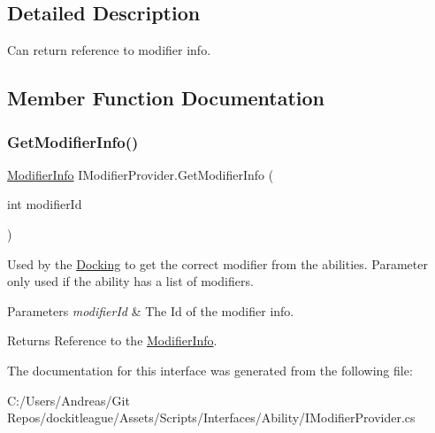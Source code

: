 \subsection{Detailed Description}
Can return reference to modifier info. 



\subsection{Member Function Documentation}
\hypertarget{interface_i_modifier_provider_ac9efab639fbb30738379cd5886c1489f}{}\label{interface_i_modifier_provider_ac9efab639fbb30738379cd5886c1489f} 
\subsubsection{\texorpdfstring{Get\+Modifier\+Info()}{GetModifierInfo()}}
{\footnotesize\ttfamily \hyperlink{struct_modifier_info}{Modifier\+Info} I\+Modifier\+Provider.\+Get\+Modifier\+Info (\begin{DoxyParamCaption}\item[{int}]{modifier\+Id }\end{DoxyParamCaption})}



Used by the \hyperlink{class_docking}{Docking} to get the correct modifier from the abilities. Parameter only used if the ability has a list of modifiers. 


\begin{DoxyParams}{Parameters}
{\em modifier\+Id} & The Id of the modifier info.\\
\hline
\end{DoxyParams}
\begin{DoxyReturn}{Returns}
Reference to the \hyperlink{struct_modifier_info}{Modifier\+Info}.
\end{DoxyReturn}


The documentation for this interface was generated from the following file\+:\begin{DoxyCompactItemize}
\item 
C\+:/\+Users/\+Andreas/\+Git Repos/dockitleague/\+Assets/\+Scripts/\+Interfaces/\+Ability/I\+Modifier\+Provider.\+cs\end{DoxyCompactItemize}
